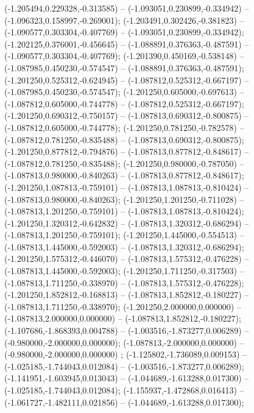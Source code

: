  (-1.205494,0.229328,-0.313585) -- (-1.093051,0.230899,-0.334942) -- (-1.096323,0.158997,-0.269001);
 (-1.203491,0.302426,-0.381823) -- (-1.090577,0.303304,-0.407769) -- (-1.093051,0.230899,-0.334942);
 (-1.202125,0.376001,-0.456645) -- (-1.088891,0.376363,-0.487591) -- (-1.090577,0.303304,-0.407769);
 (-1.201390,0.450169,-0.538148) -- (-1.087985,0.450230,-0.574547) -- (-1.088891,0.376363,-0.487591);
 (-1.201250,0.525312,-0.624945) -- (-1.087812,0.525312,-0.667197) -- (-1.087985,0.450230,-0.574547);
 (-1.201250,0.605000,-0.697613) -- (-1.087812,0.605000,-0.744778) -- (-1.087812,0.525312,-0.667197);
 (-1.201250,0.690312,-0.750157) -- (-1.087813,0.690312,-0.800875) -- (-1.087812,0.605000,-0.744778);
 (-1.201250,0.781250,-0.782578) -- (-1.087812,0.781250,-0.835488) -- (-1.087813,0.690312,-0.800875);
 (-1.201250,0.877812,-0.794876) -- (-1.087813,0.877812,-0.848617) -- (-1.087812,0.781250,-0.835488);
 (-1.201250,0.980000,-0.787050) -- (-1.087813,0.980000,-0.840263) -- (-1.087813,0.877812,-0.848617);
 (-1.201250,1.087813,-0.759101) -- (-1.087813,1.087813,-0.810424) -- (-1.087813,0.980000,-0.840263);
 (-1.201250,1.201250,-0.711028) -- (-1.087813,1.201250,-0.759101) -- (-1.087813,1.087813,-0.810424);
 (-1.201250,1.320312,-0.642832) -- (-1.087813,1.320312,-0.686294) -- (-1.087813,1.201250,-0.759101);
 (-1.201250,1.445000,-0.554513) -- (-1.087813,1.445000,-0.592003) -- (-1.087813,1.320312,-0.686294);
 (-1.201250,1.575312,-0.446070) -- (-1.087813,1.575312,-0.476228) -- (-1.087813,1.445000,-0.592003);
 (-1.201250,1.711250,-0.317503) -- (-1.087813,1.711250,-0.338970) -- (-1.087813,1.575312,-0.476228);
 (-1.201250,1.852812,-0.168813) -- (-1.087813,1.852812,-0.180227) -- (-1.087813,1.711250,-0.338970);
 (-1.201250,2.000000,0.000000) -- (-1.087813,2.000000,0.000000) -- (-1.087813,1.852812,-0.180227);
 (-1.107686,-1.868393,0.004788) -- (-1.003516,-1.873277,0.006289) -- (-0.980000,-2.000000,0.000000);
 (-1.087813,-2.000000,0.000000) -- (-0.980000,-2.000000,0.000000) ;
 (-1.125802,-1.736089,0.009153) -- (-1.025185,-1.744043,0.012084) -- (-1.003516,-1.873277,0.006289);
 (-1.141951,-1.603945,0.013043) -- (-1.044689,-1.613288,0.017300) -- (-1.025185,-1.744043,0.012084);
 (-1.155937,-1.472868,0.016413) -- (-1.061727,-1.482111,0.021856) -- (-1.044689,-1.613288,0.017300);
